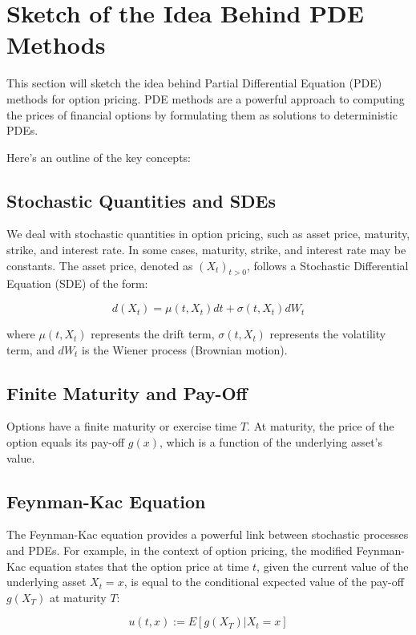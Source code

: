 \section{Sketch of the Idea Behind PDE Methods}

This section will sketch the idea behind Partial Differential Equation (PDE) methods for option pricing. PDE methods are a powerful approach to computing the prices of financial options by formulating them as solutions to deterministic PDEs.

Here's an outline of the key concepts:

\subsection{Stochastic Quantities and SDEs}

We deal with stochastic quantities in option pricing, such as asset price, maturity, strike, and interest rate. In some cases, maturity, strike, and interest rate may be constants. The asset price, denoted as ${(X_t)}_{t > 0}$, follows a Stochastic Differential Equation (SDE) of the form:

\[
d(X_t) = \mu(t, X_t) dt + \sigma(t, X_t) dW_t
\]

where $\mu(t, X_t)$ represents the drift term, $\sigma(t, X_t)$ represents the volatility term, and $dW_t$ is the Wiener process (Brownian motion).

\subsection{Finite Maturity and Pay-Off}

Options have a finite maturity or exercise time $T$. At maturity, the price of the option equals its pay-off $g(x)$, which is a function of the underlying asset's value.

\subsection{Feynman-Kac Equation}

The Feynman-Kac equation provides a powerful link between stochastic processes and PDEs. For example, in the context of option pricing, the modified Feynman-Kac equation states that the option price at time $t$, given the current value of the underlying asset $X_t = x$, is equal to the conditional expected value of the pay-off $g(X_T)$ at maturity $T$:

\[
u(t, x) := E[g(X_T) | X_t = x]
\]

